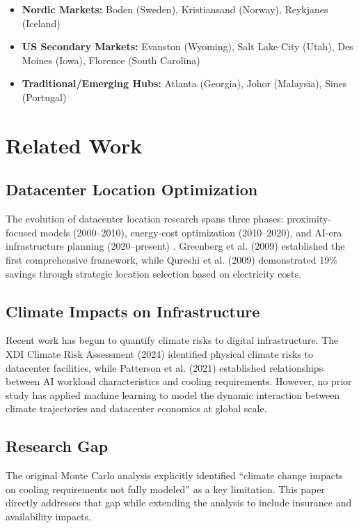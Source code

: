 \documentclass[12pt,a4paper]{article}
\begin{document}
\begin{itemize}
    \item \textbf{Nordic Markets:} Boden (Sweden), Kristiansand (Norway), Reykjanes (Iceland)
    \item \textbf{US Secondary Markets:} Evanston (Wyoming), Salt Lake City (Utah), Des Moines (Iowa), Florence (South Carolina)
    \item \textbf{Traditional/Emerging Hubs:} Atlanta (Georgia), Johor (Malaysia), Sines (Portugal)
\end{itemize}

\section{Related Work}
\label{sec:related}

\subsection{Datacenter Location Optimization}

The evolution of datacenter location research spans three phases: proximity-focused models (2000--2010), energy-cost optimization (2010--2020), and AI-era infrastructure planning (2020--present) \citep{dccore2025}. Greenberg et al. (2009) established the first comprehensive framework, while Qureshi et al. (2009) demonstrated 19\% savings through strategic location selection based on electricity costs.

\subsection{Climate Impacts on Infrastructure}

Recent work has begun to quantify climate risks to digital infrastructure. The XDI Climate Risk Assessment (2024) identified physical climate risks to datacenter facilities, while Patterson et al. (2021) established relationships between AI workload characteristics and cooling requirements. However, no prior study has applied machine learning to model the dynamic interaction between climate trajectories and datacenter economics at global scale.

\subsection{Research Gap}

The original Monte Carlo analysis \citep{dccore2025} explicitly identified ``climate change impacts on cooling requirements not fully modeled'' as a key limitation. This paper directly addresses that gap while extending the analysis to include insurance and availability impacts.
\end{document}
